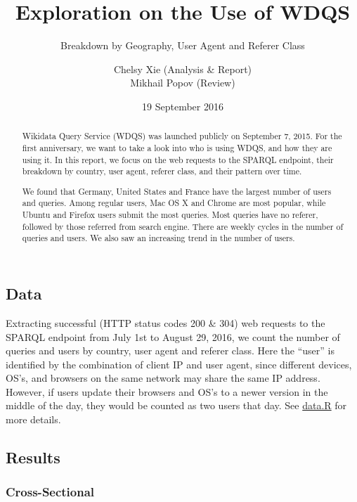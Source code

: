 \documentclass[12pt,]{article}
\title{Exploration on the Use of WDQS}
\subtitle{Breakdown by Geography, User Agent and Referer Class}
\author{Chelsy Xie (Analysis \& Report) \\ Mikhail Popov (Review)}
\date{19 September 2016}
\begin{document}
\maketitle

\renewcommand{\abstractname}{Executive Summary}

\begin{abstract}
Wikidata Query Service (WDQS) was launched publicly on September 7, 2015. For the first anniversary, we want to take a look into who is using WDQS, and how they are using it. In this report, we focus on the web requests to the SPARQL endpoint, their breakdown by country, user agent, referer class, and their pattern over time. 

We found that Germany, United States and France have the largest number of users and queries. Among regular users, Mac OS X and Chrome are most popular, while Ubuntu and Firefox users submit the most queries. Most queries have no referer, followed by those referred from search engine. There are weekly cycles in the number of queries and users. We also saw an increasing trend in the number of users.
\end{abstract}

\subsection{Data}\label{data}

Extracting successful (HTTP status codes 200 \& 304) web requests to the
SPARQL endpoint from July 1st to August 29, 2016, we count the number of
queries and users by country, user agent and referer class. Here the
``user'' is identified by the combination of client IP and user agent,
since different devices, OS's, and browsers on the same network may
share the same IP address. However, if users update their browsers and
OS's to a newer version in the middle of the day, they would be counted
as two users that day. See
\href{https://github.com/wikimedia-research/Discovery-WDQS-Usage-Explore/blob/master/data.R}{data.R}
for more details.

\newpage

\subsection{Results}\label{results}

\subsubsection{Cross-Sectional}\label{cross-sectional}
\end{document}
